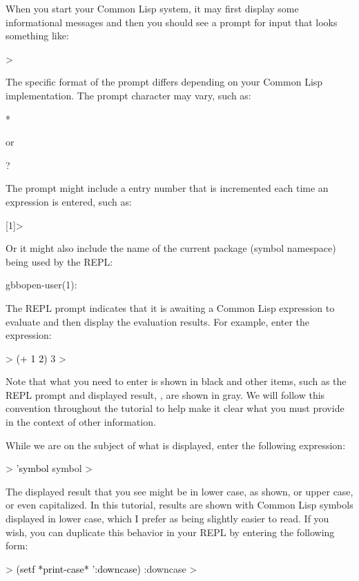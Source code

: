 \documentclass[10pt,twoside,english,pdftex]{article}
\begin{document}
When you start your Common Lisp system, it may first display some informational
messages and then you should see a prompt for input that looks something like:
%
\begin{example}\color{darkergray}%
  > 
\end{example}
%
The specific format of the prompt differs depending on your Common Lisp
implementation.  The prompt character may vary, such as:
%
\begin{example}\color{darkergray}%
  * 
\end{example}
%
or
%
\begin{example}\color{darkergray}%
  ? 
\end{example}
%
The prompt might include a entry number that is incremented each time an
expression is entered, such as:
%
\begin{example}\color{darkergray}%
  [1]> 
\end{example}
%
Or it might also include the name of the current package (symbol namespace)
being used by the REPL:
%
\begin{example}\color{darkergray}%
  gbbopen-user(1): 
\end{example}

The REPL prompt indicates that it is awaiting a Common Lisp expression to
evaluate and then display the evaluation results. For example, enter the
expression:
%
\begin{example}\color{darkergray}%
  > \textcolor{black}{(+ 1 2)}
  3
  >
\end{example}
%
Note that what you need to enter is shown in black and other items, such as
the REPL prompt and displayed result, , are shown in gray.  We will
follow this convention throughout the tutorial to help make it clear what you
must provide in the context of other information.

%
While we are on the subject of what is displayed, enter the following expression:
%
\begin{example}\color{darkergray}%
  > \textcolor{black}{'symbol}
  symbol
  >
\end{example}
%
The displayed result that you see might be in lower case, as shown, or upper
case, or even capitalized.  In this tutorial, results are shown with Common
Lisp symbols displayed in lower case, which I prefer as being slightly easier
to read.  If you wish, you can duplicate this behavior in your REPL by
entering the following form:
%
\begin{example}\color{darkergray}%
  > \textcolor{black}{(setf *print-case* ':downcase)}
  :downcase
  >
\end{example}
\end{document}
